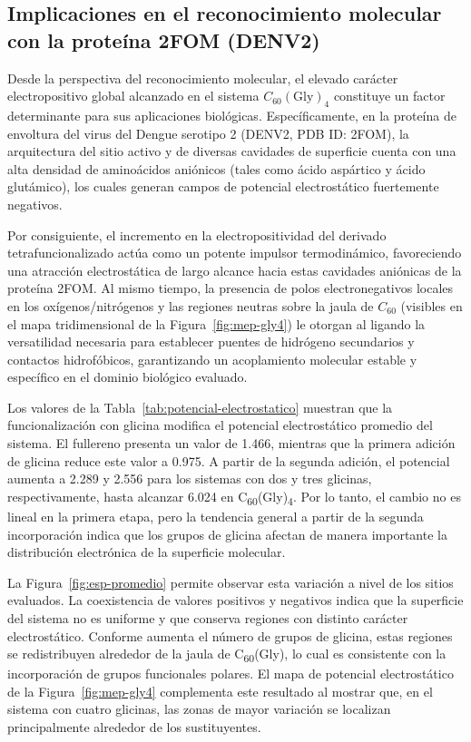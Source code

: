 \subsection{Implicaciones en el reconocimiento molecular con la proteína 2FOM (DENV2)}

Desde la perspectiva del reconocimiento molecular, el elevado carácter electropositivo global alcanzado en el sistema $C_{60}(\text{Gly})_4$ constituye un factor determinante para sus aplicaciones biológicas. Específicamente, en la proteína de envoltura del virus del Dengue serotipo 2 (DENV2, PDB ID: 2FOM), la arquitectura del sitio activo y de diversas cavidades de superficie cuenta con una alta densidad de aminoácidos aniónicos (tales como ácido aspártico y ácido glutámico), los cuales generan campos de potencial electrostático fuertemente negativos.

Por consiguiente, el incremento en la electropositividad del derivado tetrafuncionalizado actúa como un potente impulsor termodinámico, favoreciendo una atracción electrostática de largo alcance hacia estas cavidades aniónicas de la proteína 2FOM. Al mismo tiempo, la presencia de polos electronegativos locales en los oxígenos/nitrógenos y las regiones neutras sobre la jaula de $C_{60}$ (visibles en el mapa tridimensional de la Figura~\ref{fig:mep-gly4}) le otorgan al ligando la versatilidad necesaria para establecer puentes de hidrógeno secundarios y contactos hidrofóbicos, garantizando un acoplamiento molecular estable y específico en el dominio biológico evaluado.


Los valores de la Tabla~\ref{tab:potencial-electrostatico} muestran que la funcionalización con glicina modifica el potencial electrostático promedio del sistema. El fullereno presenta un valor de 1.466, mientras que la primera adición de glicina reduce este valor a 0.975. A partir de la segunda adición, el potencial aumenta a 2.289 y 2.556 para los sistemas con dos y tres glicinas, respectivamente, hasta alcanzar 6.024 en C\textsubscript{60}(Gly)\textsubscript{4}. Por lo tanto, el cambio no es lineal en la primera etapa, pero la tendencia general a partir de la segunda incorporación indica que los grupos de glicina afectan de manera importante la distribución electrónica de la superficie molecular.

La Figura~\ref{fig:esp-promedio} permite observar esta variación a nivel de los sitios evaluados. La coexistencia de valores positivos y negativos indica que la superficie del sistema no es uniforme y que conserva regiones con distinto carácter electrostático. Conforme aumenta el número de grupos de glicina, estas regiones se redistribuyen alrededor de la jaula de C\textsubscript{60}(Gly), lo cual es consistente con la incorporación de grupos funcionales polares. El mapa de potencial electrostático de la Figura~\ref{fig:mep-gly4} complementa este resultado al mostrar que, en el sistema con cuatro glicinas, las zonas de mayor variación se localizan principalmente alrededor de los sustituyentes.
    
